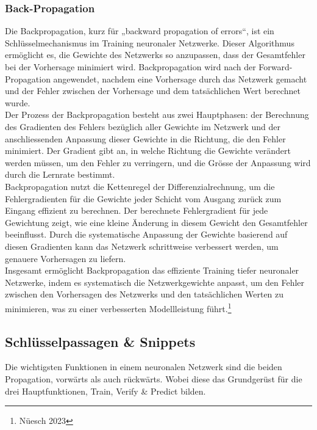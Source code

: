 \subsubsection{Back-Propagation}
\label{sec:RealBackPropagation}
Die Backpropagation, kurz für „backward propagation of errors“, ist ein Schlüsselmechanismus im Training neuronaler Netzwerke. Dieser Algorithmus ermöglicht es, die Gewichte des Netzwerks so anzupassen, dass der Gesamtfehler bei der Vorhersage minimiert wird. Backpropagation wird nach der Forward-Propagation angewendet, nachdem eine Vorhersage durch das Netzwerk gemacht und der Fehler zwischen der Vorhersage und dem tatsächlichen Wert berechnet wurde.
\\
Der Prozess der Backpropagation besteht aus zwei Hauptphasen: der Berechnung des Gradienten des Fehlers bezüglich aller Gewichte im Netzwerk und der anschliessenden Anpassung dieser Gewichte in die Richtung, die den Fehler minimiert. Der Gradient gibt an, in welche Richtung die Gewichte verändert werden müssen, um den Fehler zu verringern, und die Grösse der Anpassung wird durch die Lernrate bestimmt.
\\
Backpropagation nutzt die Kettenregel der Differenzialrechnung, um die Fehlergradienten für die Gewichte jeder Schicht vom Ausgang zurück zum Eingang effizient zu berechnen. Der berechnete Fehlergradient für jede Gewichtung zeigt, wie eine kleine Änderung in diesem Gewicht den Gesamtfehler beeinflusst. Durch die systematische Anpassung der Gewichte basierend auf diesen Gradienten kann das Netzwerk schrittweise verbessert werden, um genauere Vorhersagen zu liefern.
\\
Insgesamt ermöglicht Backpropagation das effiziente Training tiefer neuronaler Netzwerke, indem es systematisch die Netzwerkgewichte anpasst, um den Fehler zwischen den Vorhersagen des Netzwerks und den tatsächlichen Werten zu minimieren, was zu einer verbesserten Modellleistung führt.\footnote{Nüesch 2023}

\subsection{Schlüsselpassagen \& Snippets} %
\label{sec:RealSnippetsCode}
Die wichtigsten Funktionen in einem neuronalen Netzwerk sind die beiden Propagation, vorwärts als auch rückwärts. Wobei diese das Grundgerüst für die drei Hauptfunktionen, Train, Verify \& Predict bilden.

